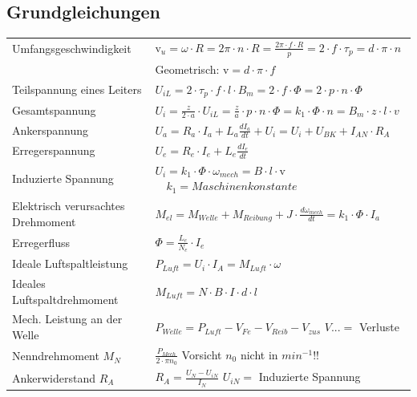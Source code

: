     
    \subsection{Grundgleichungen}
    \begin{minipage}{15.1cm}
    \begin{tabular}[c]{ | p{6cm} | p{8cm} |}
    	\hline
    	Umfangsgeschwindigkeit & v$_u=\omega\cdot R = 2\pi\cdot n \cdot
    	R=\frac{2\pi\cdot f \cdot R}{p}=2\cdot f \cdot \tau_p = d\cdot\pi\cdot n$\\
    	 & Geometrisch: v$=d\cdot\pi\cdot f$\\
    	\hline
    	Teilspannung eines Leiters & $U_{iL}=2\cdot \tau_p \cdot f \cdot l \cdot
    	B_m= 2\cdot f\cdot \Phi = 2\cdot p \cdot n \cdot \Phi$\\
    	\hline
    	Gesamtspannung & $U_i=\frac{z}{2\cdot a}\cdot U_{iL}=\frac{z}{a}\cdot
    	p \cdot n \cdot \Phi=k_1\cdot\Phi\cdot n = B_m \cdot z \cdot l \cdot v$\\
    	\hline
    	Ankerspannung & $U_a=R_a\cdot I_a + L_a\frac{dI_a}{dt}+U_i = U_i + U_{BK} + I_{AN} \cdot R_A$ \\
    	\hline
    	Erregerspannung & $U_e=R_e\cdot I_e + L_e\frac{dI_e}{dt}$\\
    	\hline
    	Induzierte Spannung & $U_i = k_1\cdot \Phi \cdot \omega_{mech} = B\cdot l
    	\cdot $v$ \quad k_1 = Maschinenkonstante$\\
    	\hline
    	Elektrisch verursachtes Drehmoment & $M_{el}=M_{Welle}+M_{Reibung}+J\cdot\frac{d\omega_{mech}}{dt}=k_1\cdot
    	\Phi\cdot I_a$\\
    	\hline
    	Erregerfluss & $\Phi = \frac{L_e}{N_e}\cdot I_e$\\
    	\hline
    	Ideale Luftspaltleistung & 
    		$P_{Luft}=U_i\cdot I_A = M_{Luft} \cdot \omega $\\
    	\hline
    	Ideales Luftspaltdrehmoment & 
    		$M_{Luft} = N \cdot B \cdot I \cdot d \cdot l$ \\
    	\hline
    	Mech. Leistung an der Welle &
    	$P_{Welle}=P_{Luft}-V_{Fe}-V_{Reib}-V_{zus}$ \quad $V{...} =$ Verluste\\
    	\hline
    	Nenndrehmoment $M_{N}$ & $\frac{P_{Mech}}{2 \cdot \pi n_{0}}$ \qquad Vorsicht $n_0$ nicht in $min^{-1}$!! \\ \hline
    	Ankerwiderstand $R_{A}$ & $R_{A} = \frac{U_{N} - U_{iN}}{I_{N}} $ \qquad $U_{iN} =$ Induzierte Spannung \\ \hline
    \end{tabular}
    \end{minipage}
